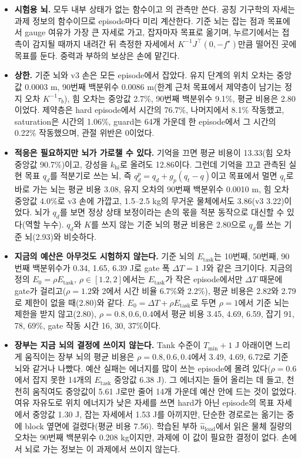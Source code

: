 \documentclass[11pt]{article}\usepackage[margin=1in]{geometry}\usepackage{amsmath,amssymb,amsthm,mathtools}\usepackage{graphicx}\graphicspath{{figures/}{../figures/}{figs/}{./}}\usepackage{enumitem}\usepackage{hyperref}\usepackage{cleveref}\usepackage{tikz}\usetikzlibrary{arrows.meta,positioning,calc,shapes.geometric}\usepackage{float}\usepackage{rotating}\usepackage[most]{tcolorbox}\usepackage{kotex}\usepackage{booktabs}\usepackage{longtable}\emergencystretch=1.6em\tolerance=2000 \crefname{assumption}{Assumption}{Assumptions}\Crefname{assumption}{Assumption}{Assumptions}\crefname{definition}{Definition}{Definitions}\Crefname{definition}{Definition}{Definitions}\crefname{proposition}{Proposition}{Propositions}\Crefname{proposition}{Proposition}{Propositions}\crefname{fact}{Fact}{Facts}\Crefname{fact}{Fact}{Facts} \newtheorem{assumption}{Assumption}\newtheorem{definition}{Definition}\newtheorem{lemma}{Lemma}\newtheorem{proposition}{Proposition}\newtheorem{theorem}{Theorem}\newtheorem{corollary}{Corollary}\newtheorem{fact}{Fact}\theoremstyle{remark}\newtheorem{remark}{Remark} \newcommand{\R}{\mathbb{R}}\newcommand{\xb}{\bar x}\newcommand{\Ab}{\bar A}\newcommand{\By}{\bar B_y}\newcommand{\U}{\mathcal U}\newcommand{\Z}{\mathcal Z}
\begin{document}
\begin{itemize}
\item \textbf{시험용 뇌.} 모두 내부 상태가 없는 함수이고 의 관측만 쓴다. 공칭 기구학의 자세는 과제 정보의 함수이므로 episode마다 미리 계산한다. 기준 뇌는 잡는 점과 목표에서 gauge 여유가 가장 큰 자세로 가고, 잡자마자 목표로 옮기며, 누르기에서는 접촉이 감지될 때까지 내려간 뒤 측정한 자세에서 $K^{-1}J^\top(0,-f^\star)$만큼 떨어진 곳에 목표를 둔다. 중력과 부하의 보상은 손에 맡긴다.
\item \textbf{상한.} 기준 뇌와 v3 손은 모든 episode에서 잡았다. 유지 단계의 위치 오차는 중앙값 0.0003 m, 90번째 백분위수 0.0086 m(한계 근처 목표에서 제약층이 남기는 정지 오차 $K^{-1}\tau_b$), 힘 오차는 중앙값 2.7\%, 90번째 백분위수 9.1\%, 평균 비용은 2.80이었다. 제약층은 hard episode에서 시간의 76.7\%, 나머지에서 8.1\% 작동했고, saturation은 시간의 1.06\%, guard는 64개 가운데 한 episode에서 그 시간의 0.22\% 작동했으며, 관절 위반은 0이었다.
\item \textbf{적응은 필요하지만 뇌가 가로챌 수 있다.} 기억을 끄면 평균 비용이 13.33(힘 오차 중앙값 90.7\%)이고, 강성을 $k_{\mathrm{hi}}$로 올려도 12.86이다. 그런데 기억을 끄고 관측된 실현 목표 $q_d$를 적분기로 쓰는 뇌, 즉 $q_d^p=q_d+g_p(q_t-q)$이고 목표에서 멀면 $q_t$로 바로 가는 뇌는 평균 비용 3.08, 유지 오차의 90번째 백분위수 0.0010 m, 힘 오차 중앙값 4.0\%로 v3 손에 가깝고, 1.5--2.5 kg의 무거운 물체에서도 3.86(v3 3.22)이었다. 뇌가 $q_d$를 보면 정상 상태 보정이라는 손의 몫을 적분 동작으로 대신할 수 있다(역할 누수). $q_d$와 $K$를 쓰지 않는 기준 뇌의 평균 비용은 2.80으로 $q_d$를 쓰는 기준 뇌(2.93)와 비슷하다.
\item \textbf{지금의 예산은 아무것도 시험하지 않는다.} 기준 뇌의 $E_{\mathrm{task}}$는 10번째, 50번째, 90번째 백분위수가 0.34, 1.65, 6.39 J로 gate 폭 $\Delta T=1$ J와 같은 크기이다. 지금의 정의 $E_0=\rho E_{\mathrm{task}}$, $\rho\in[1.2,2]$에서는 $E_{\mathrm{task}}$가 작은 episode에서만 $\Delta T$ 때문에 gate가 걸리고($\rho=1.2$와 2에서 시간 비율 6.7\%와 2.2\%), 평균 비용은 2.82와 2.79로 제한이 없을 때(2.80)와 같다. $E_0=\Delta T+\rho E_{\mathrm{task}}$로 두면 $\rho=1$에서 기준 뇌는 제한을 받지 않고(2.80), $\rho=0.8,0.6,0.4$에서 평균 비용 3.45, 4.69, 6.59, 잡기 91, 78, 69\%, gate 작동 시간 16, 30, 37\%이다.
\item \textbf{장부는 지금 뇌의 결정에 쓰이지 않는다.} Tank 수준이 $T_{\min}+1$ J 아래이면 느리게 움직이는 장부 뇌의 평균 비용은 $\rho=0.8,0.6,0.4$에서 3.49, 4.69, 6.72로 기준 뇌와 같거나 나빴다. 예산 실패는 에너지를 많이 쓰는 episode에 몰려 있다($\rho=0.6$에서 잡지 못한 14개의 $E_{\mathrm{task}}$ 중앙값 6.38 J). 그 에너지는 들어 올리는 데 들고, 천천히 움직여도 중앙값이 5.61 J로만 줄어 14개 가운데 예산 안에 드는 것이 없었다. 여유 자유도로 위치 에너지가 낮은 자세를 쓰면 hard가 아닌 episode의 목표 자세에서 중앙값 1.30 J, 잡는 자세에서 1.53 J를 아끼지만, 단순한 경로로는 옮기는 중에 block 옆면에 걸렸다(평균 비용 7.56). 학습된 부하 $\hat u_{\mathrm{load}}$에서 읽은 물체 질량의 오차는 90번째 백분위수 0.208 kg이지만, 과제에 이 값이 필요한 결정이 없다. 손에서 뇌로 가는 정보는 이 과제에서 쓰이지 않는다.

\end{itemize}
\end{document}
